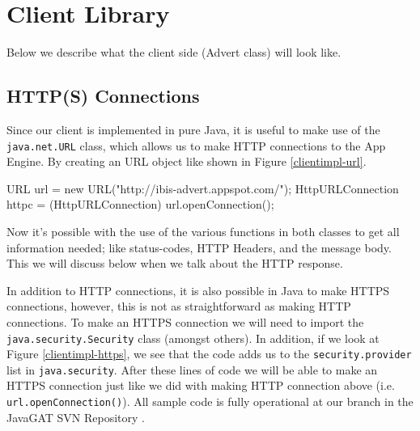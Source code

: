 \section{Client Library}
\label{clientimpl}
Below we describe what the client side (Advert class) will look like.

\subsection{HTTP(S) Connections}
Since our client is implemented in pure Java, it is useful to make use of the
\texttt{java.net.URL} class, which allows us to make HTTP connections to the
App Engine. By creating an URL object like shown in Figure \ref{clientimpl-url}.

\begin{figure*}[ht] %
\begin{center}
\begin{code}
URL url = new URL("http://ibis-advert.appspot.com/");
HttpURLConnection httpc = (HttpURLConnection) url.openConnection();
\end{code}
\caption{Opening an HTTP Connection.\label{clientimpl-url}}
\end{center}
\end{figure*}

Now it's possible with the use of the various functions in both classes to get
all information needed; like status-codes, HTTP Headers, and the message body.
This we will discuss below when we talk about the HTTP response.

In addition to HTTP connections, it is also possible in Java to make HTTPS
connections, however, this is not as straightforward as making HTTP connections.
To make an HTTPS connection we will need to import the
\texttt{java.security.Security} class (amongst others). In addition, if we look
at Figure \ref{clientimpl-https}, we see that the code adds us to the
\texttt{security.provider} list in \texttt{java.security}. After these lines of
code we will be able to make an HTTPS connection just like we did with making
HTTP connection above (i.e. \texttt{url.openConnection()}). All sample code is
fully operational at our branch in the JavaGAT SVN Repository .

